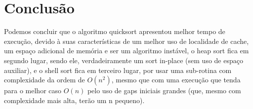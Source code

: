 \documentclass{article}
\begin{document}
\section{Conclusão}

Podemos concluir que o algoritmo quicksort apresentou melhor tempo de execução, devido à suas características de um melhor uso de localidade de cache, um espaço adicional de memória e ser um algoritmo instável, o heap sort fica em segundo lugar, sendo ele, verdadeiramente um sort in-place (sem uso de espaço auxiliar), e o shell sort fica em terceiro lugar, por usar uma sub-rotina com complexidade da ordem de \(O(n^2)\), mesmo que com uma execução que tenda para o melhor caso \(O(n)\) pelo uso de gaps iniciais grandes (que, mesmo com complexidade mais alta, terão um n pequeno).



\end{document}
